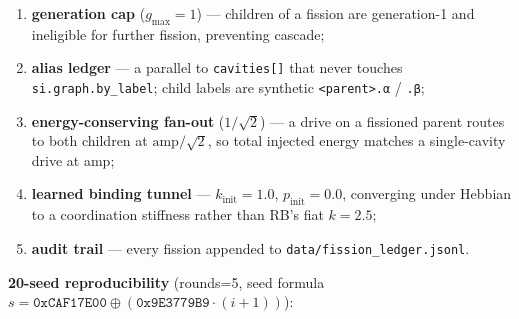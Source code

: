 \documentclass[
  11pt,
  a4paper,
]{article}
\providecommand{\tightlist}{%
  \setlength{\itemsep}{0pt}\setlength{\parskip}{0pt}}
\begin{document}
\begin{enumerate}
\def\labelenumi{\arabic{enumi}.}
\tightlist
\item
  \textbf{generation cap} (\(g_{\max}=1\)) --- children of a fission are
  generation-1 and ineligible for further fission, preventing cascade;
\item
  \textbf{alias ledger} --- a parallel to \texttt{cavities{[}{]}} that
  never touches \texttt{si.graph.by\_label}; child labels are synthetic
  \texttt{\textless{}parent\textgreater{}.α} / \texttt{.β};
\item
  \textbf{energy-conserving fan-out} (\(1/\sqrt{2}\)) --- a drive on a
  fissioned parent routes to both children at \(\text{amp}/\sqrt{2}\),
  so total injected energy matches a single-cavity drive at amp;
\item
  \textbf{learned binding tunnel} --- \(k_\text{init}=1.0\),
  \(p_\text{init}=0.0\), converging under Hebbian to a coordination
  stiffness rather than RB's fiat \(k=2.5\);
\item
  \textbf{audit trail} --- every fission appended to
  \texttt{data/fission\_ledger.jsonl}.
\end{enumerate}

\textbf{20-seed reproducibility} (rounds=5, seed formula
\(s = \mathtt{0xCAF17E00} \oplus (\mathtt{0x9E3779B9}\cdot(i+1))\)):
\end{document}
